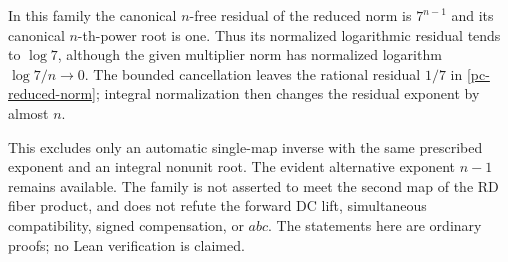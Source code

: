 In this family the canonical $n$-free residual of the reduced norm
is $7^{n-1}$ and its canonical $n$-th-power root is one. Thus its
normalized logarithmic residual tends to $\log7$, although the
given multiplier norm has normalized logarithm $\log7/n\to0$.
The bounded cancellation leaves the rational residual $1/7$ in
\eqref{pc-reduced-norm}; integral normalization then changes the
residual exponent by almost $n$.

This excludes only an automatic single-map inverse with the same
prescribed exponent and an integral nonunit root. The evident alternative
exponent $n-1$ remains available. The family is not asserted to meet
the second map of the RD fiber product, and does not refute the forward
DC lift, simultaneous compatibility, signed compensation, or $abc$.
The statements here are ordinary proofs; no Lean verification is claimed.
